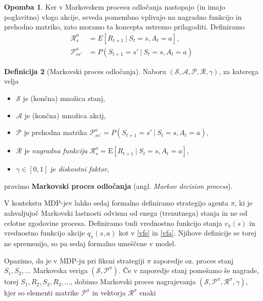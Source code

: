\documentclass[12pt,a4paper]{amsart}
\theoremstyle{definition} %
\newtheorem{definicija}{Definicija}[section]
\newtheorem{opomba}[definicija]{Opomba}
\theoremstyle{plain} %
\begin{document}
\begin{opomba}
    Ker v Markovskem procesu odločanja nastopajo (in imajo poglavitno) vlogo akcije, seveda pomembno 
    vplivajo na nagradno funkcijo in prehodno matriko, zato moramo ta koncepta ustrezno prilagoditi. 
    Definiramo
    \begin{align*}
    \mathcal{R}_s^a &= E[R_{t+1}~|~S_{t} = s, A_t = a], \\
    \mathcal{P}_{ss'}^a &= P(S_{t+1} = s'~|~S_t = s, A_t = a)
    \end{align*}
\end{opomba}

\begin{definicija}[Markovski proces odločanja]
    Naboru $(\mathcal{S}, \mathcal{A}, \mathcal{P}, \mathcal{R}, \gamma)$, za katerega velja
    \begin{itemize}
        \item $\mathcal{S}$ je (končna) množica stanj,
        \item $\mathcal{A}$ je (končna) množica akcij, 
        \item $\mathcal{P}$ je prehodna matrika $\mathcal{P}_{ss'}^a = P(S_{t+1} = s'~|~
                S_t = s, A_t = a)$, 
        \item $\mathcal{R}$ je \textit{nagradna funkcija} 
                $\mathcal{R}_s^a = \mathrm{E}[R_{t+1}~|~S_{t} = s, A_t = a]$, 
        \item $\gamma \in [0,1]$ je \textit{diskontni faktor}, 
    \end{itemize}
    pravimo \textbf{Markovski proces odločanja} (angl. \textit{Markov decision process}).
\end{definicija}

V kontekstu MDP-jev lahko sedaj formalno definiramo strategijo agenta $\pi$, ki je zahvaljujoč 
Markovski lastnosti odvisna od enega (trenutnega) stanja in ne od celotne zgodovine procesa. 
Definiramo tudi vrednostno funkcijo stanja $v_{\pi}(s)$ in vrednostno funkcijo akcije $q_{\pi}(s, a)$ 
kot v \eqref{vfs} in \eqref{vfa}. Njihove definicije se torej ne spremenijo, so pa sedaj formalno 
umeščene v model.

Opazimo, da je v MDP-ju pri fiksni strategiji $\pi$ zaporedje oz. proces stanj $S_1, S_2, \dots$ 
Markovska veriga $(\mathcal{S}, \mathcal{P}^\pi)$. Če v zaporedje stanj pomešamo še nagrade, 
torej $S_1, R_2, S_2, R_3, \dots$, dobimo Markovski proces nagrajevanja $(\mathcal{S}, 
\mathcal{P}^\pi, \mathcal{R}^\pi, \gamma)$, kjer so elementi matrike $\mathcal{P}^\pi$ in 
vektorja $\mathcal{R}^\pi$ enaki
\end{document}
